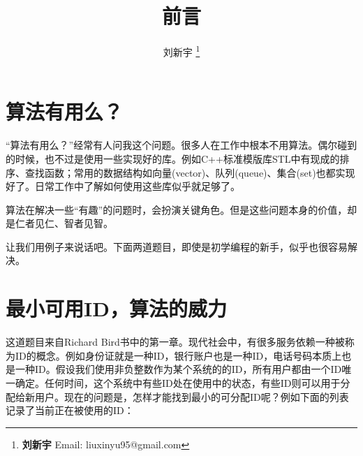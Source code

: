 \documentclass[UTF8]{article}
\begin{document}


\title{前言}

\author{刘新宇
\thanks{{\bfseries 刘新宇} \newline
  Email: liuxinyu95@gmail.com \newline}
  }

\maketitle
\fi


\section{算法有用么？}
\label{why}

“算法有用么？”经常有人问我这个问题。很多人在工作中根本不用算法。偶尔碰到的时候，也不过是使用一些实现好的库。例如C++标准模版库STL中有现成的排序、查找函数；常用的数据结构如向量(vector)、队列(queue)、集合(set)也都实现好了。日常工作中了解如何使用这些库似乎就足够了。

算法在解决一些“有趣”的问题时，会扮演关键角色。但是这些问题本身的价值，却是仁者见仁、智者见智。

让我们用例子来说话吧。下面两道题目，即使是初学编程的新手，似乎也很容易解决。

\section{最小可用ID，算法的威力}
\label{min-free} 

这道题目来自Richard Bird书中的第一章\cite{fp-pearls}。现代社会中，有很多服务依赖一种被称为ID的概念。例如身份证就是一种ID，银行账户也是一种ID，电话号码本质上也是一种ID。假设我们使用非负整数作为某个系统的的ID，所有用户都由一个ID唯一确定。任何时间，这个系统中有些ID处在使用中的状态，有些ID则可以用于分配给新用户。现在的问题是，怎样才能找到最小的可分配ID呢？例如下面的列表记录了当前正在被使用的ID：
\end{document}
